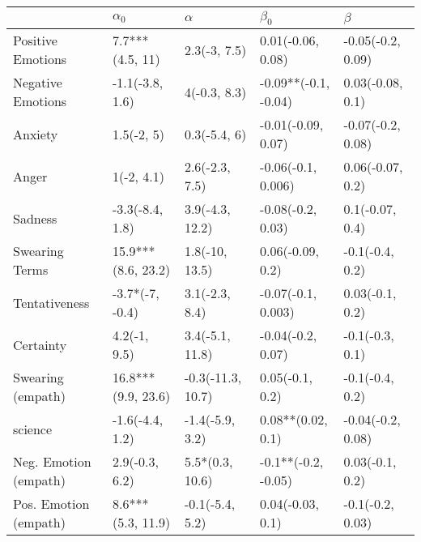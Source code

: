 \begin{tabular}{lllll}
\toprule
{} &          $\alpha_0$ &           $\alpha$ &             $\beta_0$ &            $\beta$ \\
\midrule
Positive Emotions     &     7.7***(4.5, 11) &       2.3(-3, 7.5) &     0.01(-0.06, 0.08) &  -0.05(-0.2, 0.09) \\
Negative Emotions     &     -1.1(-3.8, 1.6) &       4(-0.3, 8.3) &  -0.09**(-0.1, -0.04) &   0.03(-0.08, 0.1) \\
Anxiety               &          1.5(-2, 5) &       0.3(-5.4, 6) &    -0.01(-0.09, 0.07) &  -0.07(-0.2, 0.08) \\
Anger                 &          1(-2, 4.1) &     2.6(-2.3, 7.5) &    -0.06(-0.1, 0.006) &   0.06(-0.07, 0.2) \\
Sadness               &     -3.3(-8.4, 1.8) &    3.9(-4.3, 12.2) &     -0.08(-0.2, 0.03) &    0.1(-0.07, 0.4) \\
Swearing Terms        &  15.9***(8.6, 23.2) &     1.8(-10, 13.5) &      0.06(-0.09, 0.2) &    -0.1(-0.4, 0.2) \\
Tentativeness         &     -3.7*(-7, -0.4) &     3.1(-2.3, 8.4) &    -0.07(-0.1, 0.003) &    0.03(-0.1, 0.2) \\
Certainty             &        4.2(-1, 9.5) &    3.4(-5.1, 11.8) &     -0.04(-0.2, 0.07) &    -0.1(-0.3, 0.1) \\
Swearing (empath)     &  16.8***(9.9, 23.6) &  -0.3(-11.3, 10.7) &       0.05(-0.1, 0.2) &    -0.1(-0.4, 0.2) \\
science               &     -1.6(-4.4, 1.2) &    -1.4(-5.9, 3.2) &     0.08**(0.02, 0.1) &  -0.04(-0.2, 0.08) \\
Neg. Emotion (empath) &      2.9(-0.3, 6.2) &    5.5*(0.3, 10.6) &   -0.1**(-0.2, -0.05) &    0.03(-0.1, 0.2) \\
Pos. Emotion (empath) &   8.6***(5.3, 11.9) &    -0.1(-5.4, 5.2) &      0.04(-0.03, 0.1) &   -0.1(-0.2, 0.03) \\
\bottomrule
\end{tabular}
